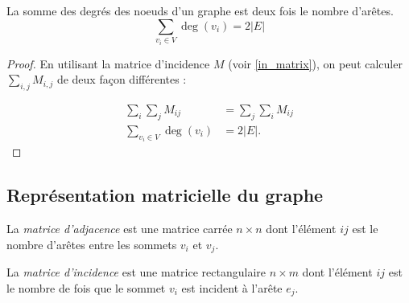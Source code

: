 \begin{mytheo} 
  La somme des degrés des noeuds d’un graphe est deux fois le nombre d’arêtes.
  $$\sum_{v_i \in V} \deg(v_i) = 2|E|$$
  \begin{proof}
    En utilisant la matrice d'incidence $M$ (voir \ref{in_matrix}),
    on peut calculer $\sum_{i,j}^{} M_{i,j}$ de deux façon différentes :\\

    \begin{align*}
      \sum_i \sum_j M_{ij} & = \sum_j \sum_i M_{ij}\\
      \sum_{v_i \in V} \deg(v_i) & = 2|E|.
    \end{align*}
  \end{proof}
\end{mytheo}

\subsection{Représentation matricielle du graphe}
\begin{mydef}
  La \emph{matrice d'adjacence} est une matrice carrée $n \times n$ dont l'élément $ij$ est le nombre d'arêtes entre les sommets $v_i$ et $v_j$.
\end{mydef}

\begin{mydef}
  \label{in_matrix}
  La \emph{matrice d'incidence} est une matrice rectangulaire $n \times m$ dont l'élément $ij$ est le nombre de fois que le sommet $v_i$ est incident à l'arête $e_j$.
\end{mydef}

